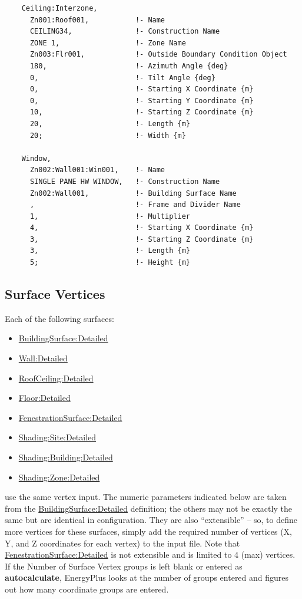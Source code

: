 \begin{lstlisting}
    Ceiling:Interzone,
      Zn001:Roof001,           !- Name
      CEILING34,               !- Construction Name
      ZONE 1,                  !- Zone Name
      Zn003:Flr001,            !- Outside Boundary Condition Object
      180,                     !- Azimuth Angle {deg}
      0,                       !- Tilt Angle {deg}
      0,                       !- Starting X Coordinate {m}
      0,                       !- Starting Y Coordinate {m}
      10,                      !- Starting Z Coordinate {m}
      20,                      !- Length {m}
      20;                      !- Width {m}

    Window,
      Zn002:Wall001:Win001,    !- Name
      SINGLE PANE HW WINDOW,   !- Construction Name
      Zn002:Wall001,           !- Building Surface Name
      ,                        !- Frame and Divider Name
      1,                       !- Multiplier
      4,                       !- Starting X Coordinate {m}
      3,                       !- Starting Z Coordinate {m}
      3,                       !- Length {m}
      5;                       !- Height {m}
\end{lstlisting}

\subsection{Surface Vertices}\label{surface-vertices}

Each of the following surfaces:

\begin{itemize}
\item
  \hyperref[buildingsurfacedetailed]{BuildingSurface:Detailed}
\item
  \hyperref[walldetailed]{Wall:Detailed}
\item
  \hyperref[roofceilingdetailed]{RoofCeiling:Detailed}
\item
  \hyperref[floordetailed]{Floor:Detailed}
\item
  \hyperref[fenestrationsurfacedetailed]{FenestrationSurface:Detailed}
\item
  \hyperref[shadingsitedetailed-shadingbuildingdetailed]{Shading:Site:Detailed}
\item
  \hyperref[shadingsitedetailed-shadingbuildingdetailed]{Shading:Building:Detailed}
\item
  \hyperref[shadingzonedetailed-000]{Shading:Zone:Detailed}
\end{itemize}

use the same vertex input. The numeric parameters indicated below are taken from the \hyperref[buildingsurfacedetailed]{BuildingSurface:Detailed} definition; the others may not be exactly the same but are identical in configuration. They are also ``extensible'' -- so, to define more vertices for these surfaces, simply add the required number of vertices (X, Y, and Z coordinates for each vertex) to the input file. Note that \hyperref[fenestrationsurfacedetailed]{FenestrationSurface:Detailed} is not extensible and is limited to 4 (max) vertices. If the Number of Surface Vertex groups is left blank or entered as \textbf{autocalculate}, EnergyPlus looks at the number of groups entered and figures out how many coordinate groups are entered.

